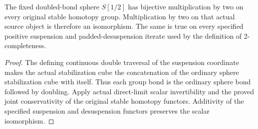 \begin{proposition}
  \label{prop:actual-sphere-invert-two-scalar}
  \leanok
  The fixed doubled-bond sphere $S[1/2]$ has bijective multiplication by two on every original stable homotopy group. Multiplication by two on that actual source object is therefore an isomorphism. The same is true on every specified positive suspension and padded-desuspension iterate used by the definition of 2-completeness.
\end{proposition}
\begin{proof}
  The defining continuous double traversal of the suspension coordinate makes the actual stabilization cube the concatenation of the ordinary sphere stabilization cube with itself. Thus each group bond is the ordinary sphere bond followed by doubling. Apply actual direct-limit scalar invertibility and the proved joint conservativity of the original stable homotopy functors. Additivity of the specified suspension and desuspension functors preserves the scalar isomorphism.
  \leanok
\end{proof}

